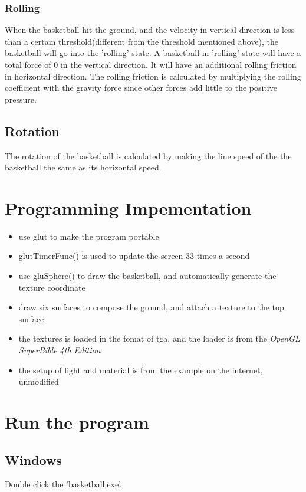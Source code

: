 \documentclass[10pt,a4paper]{article}
\begin{document}
\subsubsection{Rolling}
When the basketball hit the ground, and the velocity in vertical direction is less than a certain threshold(different from the threshold mentioned above), the basketball will go into the 'rolling' state. A basketball in 'rolling' state will have a total force of 0 in the vertical direction. It will have an additional rolling friction in horizontal direction. The rolling friction is calculated by multiplying the rolling coefficient with the gravity force since other forces add little to the positive pressure.

\subsection{Rotation}
The rotation of the basketball is calculated by making the line speed of the the basketball the same as its horizontal speed. 

\section{Programming Impementation}
\begin{itemize}
\item use glut to make the program portable
\item glutTimerFunc() is used to update the screen 33 times a second
\item use gluSphere() to draw the basketball, and automatically generate the texture coordinate
\item draw six surfaces to compose the ground, and attach a texture to the top surface
\item the textures is loaded in the fomat of tga, and the loader is from the \textsl{OpenGL SuperBible 4th Edition}
\item the setup of light and material is from the example on the internet, unmodified
\end{itemize}

\section{Run the program}
\subsection{Windows}
Double click the 'basketball.exe'.
\end{document}
